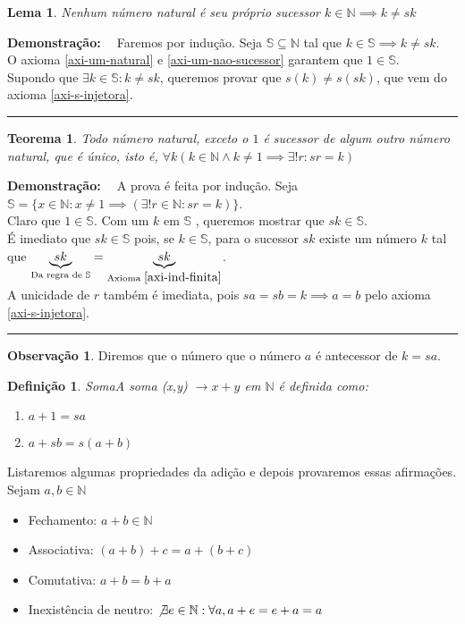 \documentclass[
	12pt,				%
	oneside,			%
	a4paper,			%
	english,			%
	french,				%
	spanish,			%
	brazil,				%
	]{abntex2}
\newcommand{\N}{\ensuremath {\mathbb{N}} }
\renewcommand{\S}{\ensuremath {\mathbb{S}} }
\theoremstyle{plain}
\newtheorem{teo}{Teorema}[chapter]
\newtheorem{lema}{Lema}[chapter]
\newtheorem{defi}{Definição}[chapter]
\theoremstyle{definition}
\newtheorem{obs}{Observação}[chapter]
\newenvironment{dem}[1][\textbf{Demonstração:} \ ]{\textbf{#1}}{\hfill\rule{2mm}{2mm}}
\begin{document}
\begin{lema}{Nenhum número natural é seu próprio sucessor}
    $k \in \N \implies k \neq sk $
\end{lema}
\begin{dem}
    Faremos por indução. Seja $\S \subseteq \N$ tal que $k \in \S \implies k \neq sk$.\\
    O axioma \ref{axi-um-natural} e \ref{axi-um-nao-sucessor} garantem que $1 \in \S$.\\
    Supondo que $\exists k \in \S : k \neq sk$, queremos provar que $s(k) \neq s(sk)$, que vem do axioma \ref{axi-s-injetora}.
\end{dem}
\begin{teo}
    Todo número natural, exceto o $1$ é sucessor de algum outro número natural, que é único, isto é, $\forall k (k \in \N \land k \neq 1 \implies \exists! r : sr = k)$
\end{teo}
\begin{dem}
    A prova é feita por indução. Seja $\S = \{x \in \N : x \neq 1 \implies (\exists!r \in \N : sr = k)\}$.\\
    Claro que $1 \in \S$. Com um $k$ em  \S, queremos mostrar que $sk \in \S$. \\
    É imediato que $sk \in \S$ pois, se $k \in \S$, para o sucessor $sk$ existe um número $k$ tal que $\underbrace{sk}_{\text{Da regra de } \S} = \underbrace{sk}_{\text{Axioma }\ref{axi-ind-finita}}$.\\
    A unicidade de $r$ também é imediata, pois $sa = sb = k \implies a = b$ pelo axioma \ref{axi-s-injetora}.
\end{dem}
\begin{obs}
    Diremos que o número que o número $a$ é antecessor de $k = sa$.
\end{obs}
\begin{defi}{Soma}\label{def-soma-N}
A soma (x,y) $\rightarrow x + y$ em \N é definida como: 
    \begin{enumerate}[label=(\roman*)]
        \item $a + 1 = sa$
        \item $a + sb = s(a+b)$
    \end{enumerate}
\end{defi}

Listaremos algumas propriedades da adição e depois provaremos essas afirmações. Sejam $a, b \in \N$
\begin{itemize}
    \item Fechamento: $a + b \in \N$
	\item Associativa: $(a + b) + c = a + (b + c)$
	\item Comutativa: $a + b =  b + a$
	\item Inexistência de neutro: $\not\exists e \in \N : \forall a, a + e = e + a = a$
\end{itemize}
\end{document}
